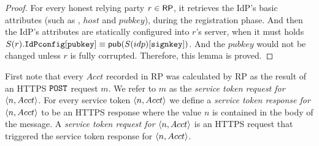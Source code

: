  \begin{proof}
 For every honest relying party $r \in \mathsf{RP}$, it retrieves the IdP's basic attributes (such as , $host$ and $pubkey$), during the registration phase. And then the IdP's attributes are statically configured into $r$'s server, when it must holds $S(r).\mathtt{IdPconfig}[\mathtt{pubkey}] \equiv \mathsf{pub}(S(idp)[\mathtt{signkey}])$. And the $pubkey$ would not be changed unless $r$ is fully corrupted. Therefore, this lemma is proved.
 \end{proof}
  
 \begin{definition}
  First note that every $Acct$ recorded in RP was calculated by RP as the result of an HTTPS $\mathtt{POST}$ request $m$. We refer to $m$ as the   \emph{service token request for $\langle n, Acct\rangle$}. For every service token $\langle n,Acct\rangle$ we define a \emph{service token response for $\langle n,Acct\rangle$} to be an HTTPS response where the value $n$ is contained in the body of the message. A \emph{service token request for $\langle n,Acct\rangle$} is an HTTPS request that triggered the service token response for $\langle n,Acct\rangle$.
\end{definition}
  
  
  
